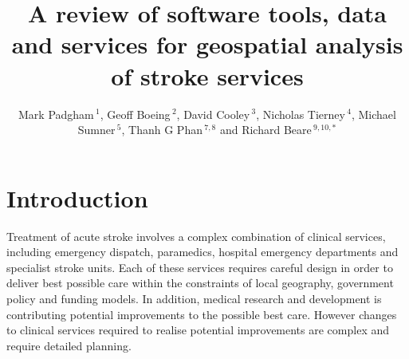 \documentclass[utf8]{frontiersHLTH}
\def\firstAuthorLast{FirstAuthor {et~al.}} %
\def\Authors{Mark Padgham\,$^{1}$, Geoff Boeing\,$^{2}$, David Cooley\,$^{3}$, Nicholas Tierney\,$^{4}$, Michael Sumner\,$^{5}$, Thanh G Phan\,$^{7,8}$ and Richard Beare\,$^{9,10,*}$}
\begin{document}
\onecolumn
{}

\title[Software tools for geospatial analysis]{A review of software tools, data and services for geospatial analysis of stroke services}

\author[\firstAuthorLast ]{\Authors} %
\address{} %
\correspondance{} %

\extraAuth{}%

\maketitle

\section{Introduction}\label{introduction}

Treatment of acute stroke involves a complex combination of clinical
services, including emergency dispatch, paramedics, hospital emergency
departments and specialist stroke units. Each of these services
requires careful design in order to deliver best possible care within
the constraints of local geography, government policy and funding
models. In addition, medical research and development is contributing
potential improvements to the possible best care. However changes to
clinical services required to realise potential improvements are
complex and require detailed planning.
\end{document}
